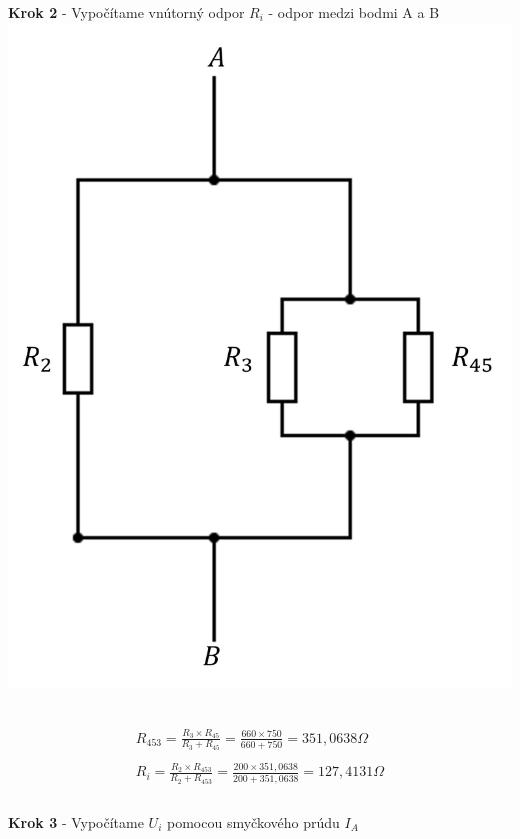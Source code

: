 \begin{center}
    \textbf{Krok 2} - Vypočítame vnútorný odpor $R_{i}$  - odpor medzi bodmi A a B
    \includegraphics[scale=0.5,keepaspectratio]{fig/pr2_2.png} \
\end{center}

\begin{gather*}
    R_{453} = \frac {R_{3} \times R_{45}} {R_{3} + R_{45}} =  \frac {660 \times 750} {660 + 750} = 351,0638 \Omega \\\\
   R_{i} = \frac {R_{2} \times R_{453}} {R_{2} + R_{453}} = \frac {200 \times 351,0638} {200 + 351,0638} = 127,4131 \Omega \\\\
\end{gather*}

\begin{center}
    \textbf{Krok 3} - Vypočítame $U_i$ pomocou smyčkového prúdu $I_A$
\end{center}

